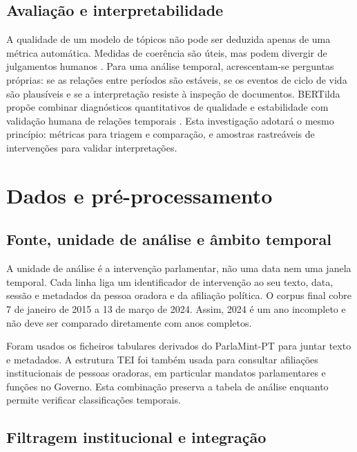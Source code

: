 \documentclass[11pt,a4paper]{article}
\begin{document}
\subsection{Avaliação e interpretabilidade}

A qualidade de um modelo de tópicos não pode ser deduzida apenas de uma métrica automática. Medidas de coerência são úteis, mas podem divergir de julgamentos humanos \citep{chang2009reading,newman2010automatic}. Para uma análise temporal, acrescentam-se perguntas próprias: se as relações entre períodos são estáveis, se os eventos de ciclo de vida são plausíveis e se a interpretação resiste à inspeção de documentos. BERTilda propõe combinar diagnósticos quantitativos de qualidade e estabilidade com validação humana de relações temporais \citep{oliveirafigueira2026bertilda}. Esta investigação adotará o mesmo princípio: métricas para triagem e comparação, e amostras rastreáveis de intervenções para validar interpretações.

\section{Dados e pré-processamento}

\subsection{Fonte, unidade de análise e âmbito temporal}

A unidade de análise é a intervenção parlamentar, não uma data nem uma janela temporal. Cada linha liga um identificador de intervenção ao seu texto, data, sessão e metadados da pessoa oradora e da afiliação política. O corpus final cobre 7 de janeiro de 2015 a 13 de março de 2024. Assim, 2024 é um ano incompleto e não deve ser comparado diretamente com anos completos.

Foram usados os ficheiros tabulares derivados do ParlaMint-PT para juntar texto e metadados. A estrutura TEI foi também usada para consultar afiliações institucionais de pessoas oradoras, em particular mandatos parlamentares e funções no Governo. Esta combinação preserva a tabela de análise enquanto permite verificar classificações temporais.

\subsection{Filtragem institucional e integração}
\end{document}
